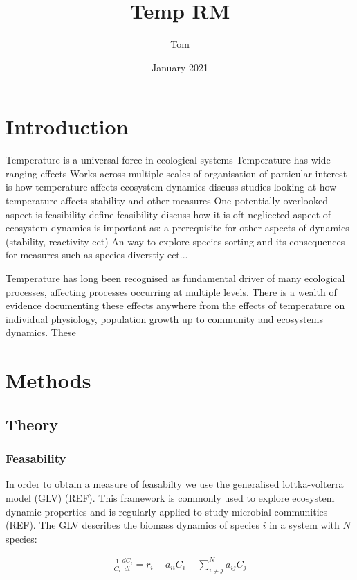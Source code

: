 \documentclass{article}
\title{Temp RM}
\author{Tom}
\date{January 2021}
\begin{document}
\maketitle

\section{Introduction}
\begin{outline}
    \1 Temperature is a universal force in ecological systems
        \2 Temperature has wide ranging effects
        \2 Works across multiple scales of organisation
    \1 of particular interest is how temperature affects ecosystem dynamics 
        \2 discuss studies looking at how temperature affects stability and other measures
    \1 One potentially overlooked aspect is feasibility 
        \2 define feasibility
        \2 discuss how it is oft negliected aspect of ecosystem dynamics
        \2 is important as:
            \3 a prerequisite for other aspects of dynamics (stability, reactivity ect) 
            \3 An way to explore species sorting and its consequences for measures such as species diverstiy ect...  
\end{outline}

Temperature has long been recognised as fundamental driver of many ecological processes, affecting processes occurring at multiple levels. There is a wealth of evidence documenting these effects anywhere from the effects of temperature on individual physiology,  population growth up to community and ecosystems dynamics. These 

\section{Methods}

\subsection{Theory}
\subsubsection{Feasability}
In order to obtain a measure of feasabilty we use the generalised lottka-volterra model (GLV) (REF). This framework is commonly used to explore ecosystem dynamic properties and is regularly applied to study microbial communities (REF). The GLV describes the biomass dynamics of species $i$ in a system with $N$ species:

\begin{align}
  \frac{1}{C_i} \frac{dC_i}{dt} = r_i - a_{ii} C_i - \sum^N_{i \neq j} a_{ij} C_j \label{GLV}
\end{align}
\end{document}
